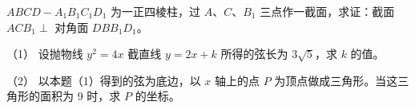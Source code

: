 \begin{question}
$ABCD-A_1B_1C_1D_1$ 为一正四棱柱，过 $A$、$C$、$B_1$ 三点作一截面，求证：截面 $ACB_1\perp$ 对角面 $DBB_1D_1$。

\end{question}
\begin{question}

（1） 设抛物线 $y^2=4x$ 截直线 $y=2x+k$ 所得的弦长为 $3\sqrt5$，求 $k$ 的值。

（2） 以本题（1）得到的弦为底边，以 $x$ 轴上的点 $P$ 为顶点做成三角形。当这三角形的面积为 9 时，求 $P$ 的坐标。

\end{question}